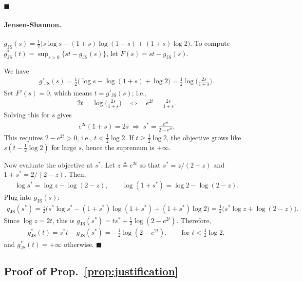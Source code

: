 \hfill $\blacksquare$



\paragraph{Jensen-Shannon.}
$g_{\mathrm{JS}}(s)=\frac12\Big(s\log s-(1+s)\log(1+s)+(1+s)\log 2\Big)$. To compute $g_{\mathrm{JS}}^\ast(t)=\sup_{s > 0}\{st-g_{\mathrm{JS}}(s)\}$, let $F(s) = st - g_{\mathrm{JS}}(s)$. 

We have 
\begin{align}
    g'_{\mathrm{JS}}(s)=\frac12\Big(\log s-\log(1+s)+\log2\Big) =\frac12\log\Big(\frac{2s}{1+s}\Big).
\end{align}
Set $F'(s)=0$, which means $t = g'_{\mathrm{JS}}(s)$; i.e., 
\begin{align}
    2t=\log\Big(\frac{2s}{1+s}\Big)
\quad\Longleftrightarrow\quad
e^{2t}=\frac{2s}{1+s}.
\end{align}
Solving this for $s$ gives
\begin{align}
    e^{2t}(1+s)=2s
\;\Rightarrow\;
s^*=\frac{e^{2t}}{2-e^{2t}}.
\end{align}
This requires $2-e^{2t} > 0$, i.e., $t < \frac{1}{2}\log 2$. If $t \geq \frac{1}{2}\log 2$, the objective grows like $s(t-\frac{1}{2}\log 2)$ for large $s$, hence the supremum is $+\infty$. 

Now evaluate the objective at $s^{\ast}$. Let $z \triangleq e^{2t}$ so that $s^{\ast} = z/(2-z)$ and $1+s^{\ast} = 2/(2-z)$. Then, 
\begin{align}
    \log s^*=\log z-\log(2-z),\qquad \log(1+s^*)=\log2-\log(2-z).
\end{align}
Plug into $g_{\mathrm{JS}}(s)$: 
\begin{align}
    g_{\mathrm{JS}}(s^*)
=\frac12\Big(s^*\log s^*-(1+s^*)\log(1+s^*)+(1+s^*)\log2\Big)
=\frac12\Big(s^*\log z+\log(2-z)\Big).
\end{align}
Since $\log z = 2t$, this is $g_{\mathrm{JS}}(s^*)=t s^*+\frac12\log(2-e^{2t})$. Therefore, 
\begin{align}
    g_{\mathrm{JS}}^*(t)
= s^* t - g_{\mathrm{JS}}(s^*)
= -\frac12\log(2-e^{2t}),
\qquad \text{for } t<\tfrac12\log2,
\end{align}
and $g_{\mathrm{JS}}^*(t)=+\infty$ otherwise. \hfill $\blacksquare$





\subsection*{Proof of Prop.~\ref{prop:justification}}

